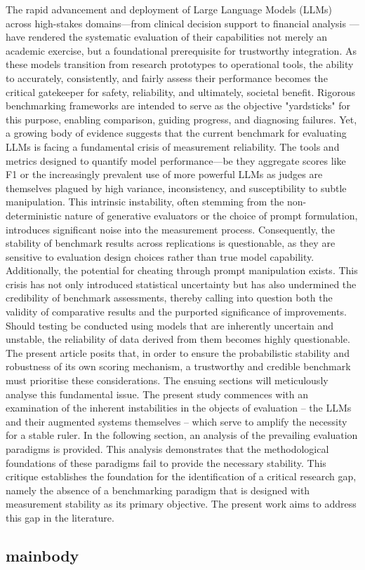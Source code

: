 The rapid advancement and deployment of Large Language Models (LLMs) across high-stakes domains—from clinical decision support to financial analysis \cite{salehin2025systematic}\cite{li2023large}\cite{shool2025systematic}—have rendered the systematic evaluation of their capabilities not merely an academic exercise, but a foundational prerequisite for trustworthy integration\cite{yu2025survey}. As these models transition from research prototypes to operational tools\cite{shen2024llm}, the ability to accurately\cite{zhou2024llm}, consistently\cite{lee2025evaluating}, and fairly assess their performance becomes the critical gatekeeper for safety, reliability, and ultimately, societal benefit\cite{zhou2023don}. Rigorous benchmarking frameworks are intended to serve as the objective "yardsticks" for this purpose, enabling comparison, guiding progress, and diagnosing failures\cite{mohammadi2025evaluation}.
Yet, a growing body of evidence suggests that the current benchmark for evaluating LLMs is facing a fundamental crisis of measurement reliability\cite{vendrow2025large}. The tools and metrics designed to quantify model performance—be they aggregate scores like F1 or the increasingly prevalent use of more powerful LLMs as judges are themselves plagued by high variance, inconsistency, and susceptibility to subtle manipulation\cite{yuan2025llm}\cite{vendrow2024large}. This intrinsic instability, often stemming from the non-deterministic nature of generative evaluators or the choice of prompt formulation, introduces significant noise into the measurement process\cite{havrilla2024understanding}. Consequently, the stability of benchmark results across replications is questionable, as they are sensitive to evaluation design choices rather than true model capability\cite{atil2024llm}. Additionally, the potential for cheating through prompt manipulation exists\cite{banerjee2024vulnerability}. This crisis has not only introduced statistical uncertainty but has also undermined the credibility of benchmark assessments, thereby calling into question both the validity of comparative results and the purported significance of improvements\cite{perlitz2024these}. Should testing be conducted using models that are inherently uncertain and unstable, the reliability of data derived from them becomes highly questionable\cite{ye2024benchmarking}\cite{yadkori2024believe}.
The present article posits that, in order to ensure the probabilistic stability and robustness of its own scoring mechanism, a trustworthy and credible benchmark must prioritise these considerations. The ensuing sections will meticulously analyse this fundamental issue. The present study commences with an examination of the inherent instabilities in the objects of evaluation – the LLMs and their augmented systems themselves – which serve to amplify the necessity for a stable ruler. In the following section, an analysis of the prevailing evaluation paradigms is provided. This analysis demonstrates that the methodological foundations of these paradigms fail to provide the necessary stability. This critique establishes the foundation for the identification of a critical research gap, namely the absence of a benchmarking paradigm that is designed with measurement stability as its primary objective. The present work aims to address this gap in the literature.

\subsection{mainbody}